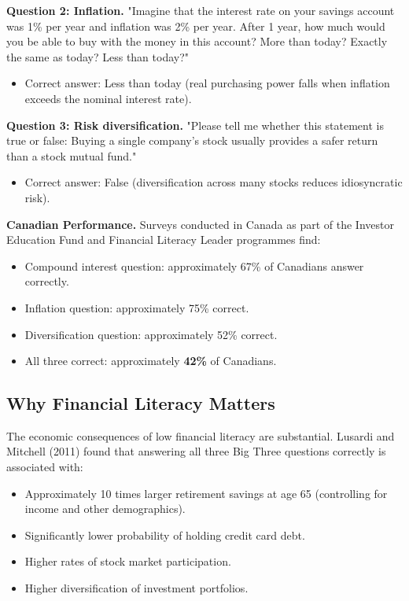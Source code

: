 \documentclass[12pt, letterpaper]{article}
\begin{document}
\textbf{Question 2: Inflation.} "Imagine that the interest rate on your savings account was 1\% per year and inflation was 2\% per year. After 1 year, how much would you be able to buy with the money in this account? More than today? Exactly the same as today? Less than today?"
\begin{itemize}
\item Correct answer: Less than today (real purchasing power falls when inflation exceeds the nominal interest rate).
\end{itemize}

\textbf{Question 3: Risk diversification.} "Please tell me whether this statement is true or false: Buying a single company's stock usually provides a safer return than a stock mutual fund."
\begin{itemize}
\item Correct answer: False (diversification across many stocks reduces idiosyncratic risk).
\end{itemize}

\textbf{Canadian Performance.} Surveys conducted in Canada as part of the Investor Education Fund and Financial Literacy Leader programmes find:
\begin{itemize}
\item Compound interest question: approximately 67\% of Canadians answer correctly.
\item Inflation question: approximately 75\% correct.
\item Diversification question: approximately 52\% correct.
\item All three correct: approximately \textbf{42\%} of Canadians.
\end{itemize}


\subsection{Why Financial Literacy Matters}


The economic consequences of low financial literacy are substantial. Lusardi and Mitchell (2011) found that answering all three Big Three questions correctly is associated with:
\begin{itemize}
\item Approximately 10 times larger retirement savings at age 65 (controlling for income and other demographics).
\item Significantly lower probability of holding credit card debt.
\item Higher rates of stock market participation.
\item Higher diversification of investment portfolios.
\end{itemize}
\end{document}

